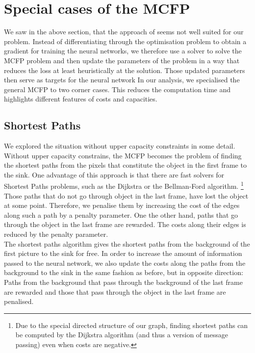 \documentclass{article}
\begin{document}
\section{Special cases of the MCFP}
We saw in the above section, that the approach of \cite{AmosK17} seems not well suited for our problem. Instead of differentiating through the optimisation problem to obtain a gradient for training the neural networks, we therefore use a solver to solve the MCFP problem and then update the parameters of the problem in a way that reduces the loss at least heuristically at the solution. Those updated parameters then serve as targets for the neural network In our analysis, we specialised the general MCFP to two corner cases. This reduces the computation time and highlights different features of costs and capacities.


\subsection{Shortest Paths}\label{shortestPaths}
We explored the situation without upper capacity constraints in some detail. Without upper capacity constrains, the MCFP becomes the problem of finding the shortest paths from the pixels that constitute the object in the first frame to the sink. One advantage of this approach is that there are fast solvers for Shortest Paths problems, such as the Dijkstra  or the Bellman-Ford algorithm.
\footnote{Due to the special directed structure of our graph, finding shortest paths can be computed by the Dijkstra algorithm (and thus a version of message passing) even when costs are negative.}
Those paths that do not go through object in the last frame, have lost the object at some point. Therefore, we penalise them by increasing the cost of the edges along such a path by a penalty parameter. One the other hand, paths that go through the object in the last frame are rewarded. The costs along their edges is reduced by the penalty parameter.\\
The shortest paths algorithm gives the shortest paths from the background of the first picture to the sink for free. In order to increase the amount of information passed to the neural network, we also update the costs along the paths from the background to the sink in the same fashion as before, but in opposite direction: Paths from the background that pass through the background of the last frame are rewarded and those that pass through the object in the last frame are penalised.\\
\end{document}
